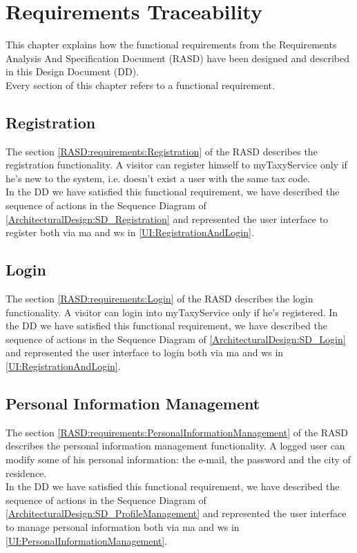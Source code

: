 \documentclass[\mainpath/main]{subfiles}
\begin{document}
\chapter{Requirements Traceability}
\label{RequirementsTraceability}
This chapter explains how the functional requirements from the Requirements Analysis And Specification Document (RASD) have been designed and described in this Design Document (DD).\\
Every section of this chapter refers to a functional requirement.

\section{Registration}
The section \ref{RASD:requirements:Registration} of the RASD describes the registration functionality. A visitor can register himself to myTaxyService only if he's new to the system, i.e. doesn't exist a user with the same tax code.\\
In the DD we have satisfied this functional requirement, we have described the sequence of actions in the Sequence Diagram of \autoref{ArchitecturalDesign:SD_Registration} and represented the user interface to register both via \gls{ma} and \gls{ws} in \autoref{UI:RegistrationAndLogin}.

\section{Login}
The section \ref{RASD:requirements:Login} of the RASD describes the login functionality. A visitor can login into myTaxyService only if he's registered.
In the DD we have satisfied this functional requirement, we have described the sequence of actions in the Sequence Diagram of \autoref{ArchitecturalDesign:SD_Login} and represented the user interface to login both via \gls{ma} and \gls{ws} in \autoref{UI:RegistrationAndLogin}.

\section{Personal Information Management}
The section \ref{RASD:requirements:PersonalInformationManagement} of the RASD describes the personal information management functionality. A logged user can modify some of his personal information: the e-mail, the password and the city of residence.\\
In the DD we have satisfied this functional requirement, we have described the sequence of actions in the Sequence Diagram of \autoref{ArchitecturalDesign:SD_ProfileManagement} and represented the user interface to manage personal information both via \gls{ma} and \gls{ws} in \autoref{UI:PersonalInformationManagement}.
\end{document}
